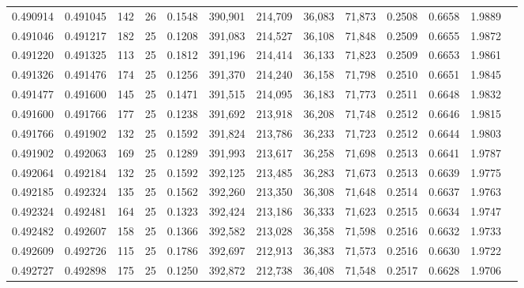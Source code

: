 \begin{tabular}{rrrrrrrrrrrrr}
0.490914 & 0.491045 &   142 &  26 &                                     0.1548 & 390,901 & 214,709 &  36,083 &  71,873 & 0.2508 & 0.6658 & 1.9889 \\
0.491046 & 0.491217 &   182 &  25 &                                     0.1208 & 391,083 & 214,527 &  36,108 &  71,848 & 0.2509 & 0.6655 & 1.9872 \\
0.491220 & 0.491325 &   113 &  25 &                                     0.1812 & 391,196 & 214,414 &  36,133 &  71,823 & 0.2509 & 0.6653 & 1.9861 \\
0.491326 & 0.491476 &   174 &  25 &                                     0.1256 & 391,370 & 214,240 &  36,158 &  71,798 & 0.2510 & 0.6651 & 1.9845 \\
0.491477 & 0.491600 &   145 &  25 &                                     0.1471 & 391,515 & 214,095 &  36,183 &  71,773 & 0.2511 & 0.6648 & 1.9832 \\
0.491600 & 0.491766 &   177 &  25 &                                     0.1238 & 391,692 & 213,918 &  36,208 &  71,748 & 0.2512 & 0.6646 & 1.9815 \\
0.491766 & 0.491902 &   132 &  25 &                                     0.1592 & 391,824 & 213,786 &  36,233 &  71,723 & 0.2512 & 0.6644 & 1.9803 \\
0.491902 & 0.492063 &   169 &  25 &                                     0.1289 & 391,993 & 213,617 &  36,258 &  71,698 & 0.2513 & 0.6641 & 1.9787 \\
0.492064 & 0.492184 &   132 &  25 &                                     0.1592 & 392,125 & 213,485 &  36,283 &  71,673 & 0.2513 & 0.6639 & 1.9775 \\
0.492185 & 0.492324 &   135 &  25 &                                     0.1562 & 392,260 & 213,350 &  36,308 &  71,648 & 0.2514 & 0.6637 & 1.9763 \\
0.492324 & 0.492481 &   164 &  25 &                                     0.1323 & 392,424 & 213,186 &  36,333 &  71,623 & 0.2515 & 0.6634 & 1.9747 \\
0.492482 & 0.492607 &   158 &  25 &                                     0.1366 & 392,582 & 213,028 &  36,358 &  71,598 & 0.2516 & 0.6632 & 1.9733 \\
0.492609 & 0.492726 &   115 &  25 &                                     0.1786 & 392,697 & 212,913 &  36,383 &  71,573 & 0.2516 & 0.6630 & 1.9722 \\
0.492727 & 0.492898 &   175 &  25 &                                     0.1250 & 392,872 & 212,738 &  36,408 &  71,548 & 0.2517 & 0.6628 & 1.9706 \\

\end{tabular}
